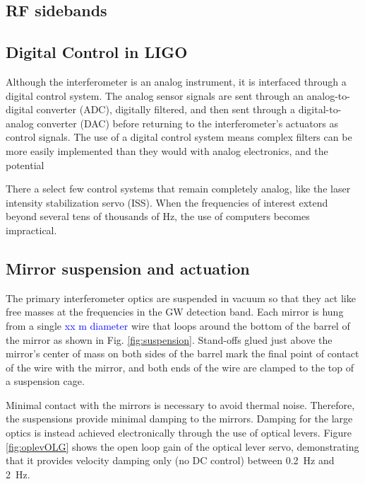 \subsection{RF sidebands}



\subsection{Digital Control in LIGO}
Although the interferometer is an analog instrument, it is interfaced
through a digital control system. The analog sensor signals are sent
through an analog-to-digital converter (ADC), digitally filtered, and
then sent through a digital-to-analog converter (DAC) before returning
to the interferometer's actuators as control signals. The use of a digital
control system means complex filters can be more easily implemented
than they would with analog electronics, and the potential 

There a select few control systems that remain completely analog, like
the laser intensity stabilization servo (ISS). When the frequencies of
interest extend beyond several tens of thousands of Hz, the use of
computers becomes impractical.




\subsection{Mirror suspension and actuation}
The primary interferometer optics are suspended in vacuum so that they
act like free masses at the frequencies in the GW detection band. Each
mirror is hung from a single \textcolor{blue}{xx m diameter} wire that
loops around the bottom of the barrel of the mirror as shown in
Fig. \ref{fig:suspension}. Stand-offs glued just above the mirror's
center of mass on both sides of the barrel mark the final point of
contact of the wire with the mirror, and both ends of the wire are
clamped to the top of a suspension cage.

Minimal contact with the mirrors is necessary to avoid thermal
noise. Therefore, the suspensions provide minimal damping to the
mirrors. Damping for the large optics is instead achieved
electronically through the use of optical levers. Figure
\ref{fig:oplevOLG} shows the open loop gain of the optical lever
servo, demonstrating that it provides velocity damping only (no DC
control) between 0.2~Hz and 2~Hz.

